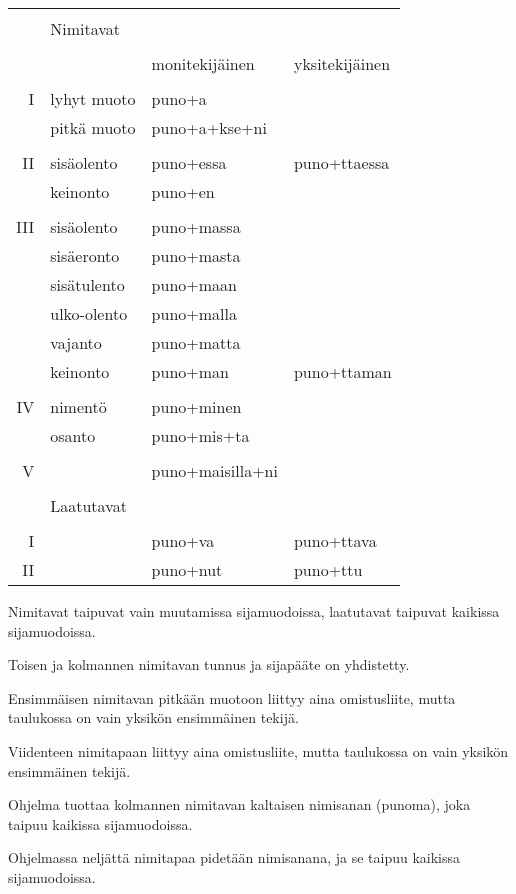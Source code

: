 \begin{tabular}[c]{@{}|r|l|l|l|} \hline
    &             &                  & \\
    & Nimitavat   &                  & \\
    &             &                  & \\ \hline
    &             & monitekijäinen   & yksitekijäinen \\ \hline
    &             &                  & \\ \hline
I   & lyhyt muoto & puno+a           & \\
    & pitkä muoto & puno+a+kse+ni    & \\
    &             &                  & \\
II  & sisäolento  & puno+essa        & puno+ttaessa \\
    & keinonto    & puno+en          & \\
    &             &                  & \\
III & sisäolento  & puno+massa       & \\
    & sisäeronto  & puno+masta       & \\
    & sisätulento & puno+maan        & \\
    & ulko-olento & puno+malla       & \\
    & vajanto     & puno+matta       & \\
    & keinonto    & puno+man         & puno+ttaman \\
    &             &                  & \\
IV  & nimentö     & puno+minen       & \\
    & osanto      & puno+mis+ta      & \\
    &             &                  & \\
V   &             & puno+maisilla+ni & \\ \hline
    &             &                  & \\
    & Laatutavat  &                  & \\
    &             &                  & \\ \hline
I   &             & puno+va          & puno+ttava \\
II  &             & puno+nut         & puno+ttu \\ \hline
\end{tabular}

\bigskip

Nimitavat taipuvat vain muutamissa sijamuodoissa, laatutavat taipuvat
kaikissa sijamuodoissa.

Toisen ja kolmannen nimitavan tunnus ja sijapääte on yhdistetty.

Ensimmäisen nimitavan pitkään muotoon liittyy aina omistusliite,
mutta taulukossa on vain yksikön ensimmäinen tekijä.

Viidenteen nimitapaan liittyy aina omistusliite, mutta taulukossa on
vain yksikön ensimmäinen tekijä.

Ohjelma tuottaa kolmannen nimitavan kaltaisen nimisanan (punoma), joka
taipuu kaikissa sijamuodoissa.

Ohjelmassa neljättä nimitapaa pidetään nimisanana, ja se taipuu
kaikissa sijamuodoissa.
